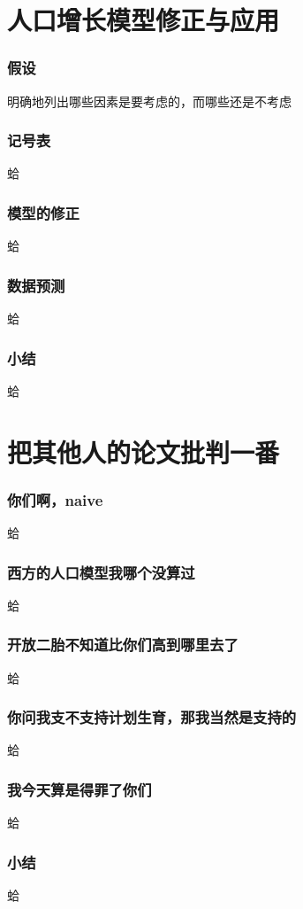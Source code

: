 \documentclass[11pt]{article}
\begin{document}
\part{人口增长模型修正与应用}
\section{假设}
	明确地列出哪些因素是要考虑的，而哪些还是不考虑
\section{记号表}
	蛤
\section{模型的修正}
	蛤
\section{数据预测}
	蛤
\section{小结}
	蛤
	
\part{把其他人的论文批判一番}
	\section{你们啊，naive}
		蛤
	\section{西方的人口模型我哪个没算过}
		蛤
	\section{开放二胎不知道比你们高到哪里去了}
		蛤
	\section{你问我支不支持计划生育，那我当然是支持的}
		蛤
	\section{我今天算是得罪了你们}
		蛤
	\section{小结}
		蛤
	
\end{document}
